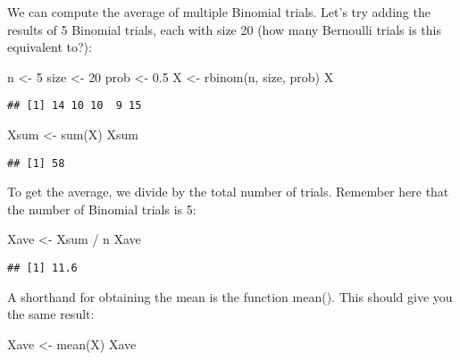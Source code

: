 \documentclass[
]{book}
\newenvironment{Shaded}{\begin{snugshade}}{\end{snugshade}}
\newcommand{\DecValTok}[1]{\textcolor[rgb]{0.00,0.00,0.81}{#1}}
\newcommand{\FloatTok}[1]{\textcolor[rgb]{0.00,0.00,0.81}{#1}}
\newcommand{\FunctionTok}[1]{\textcolor[rgb]{0.00,0.00,0.00}{#1}}
\newcommand{\NormalTok}[1]{#1}
\newcommand{\OtherTok}[1]{\textcolor[rgb]{0.56,0.35,0.01}{#1}}
\newcommand{\SpecialCharTok}[1]{\textcolor[rgb]{0.00,0.00,0.00}{#1}}
\begin{document}
We can compute the average of multiple Binomial trials. Let's try adding the results of 5 Binomial trials, each with size 20 (how many Bernoulli trials is this equivalent to?):

\begin{Shaded}
\begin{Highlighting}[]
\NormalTok{n }\OtherTok{\textless{}{-}} \DecValTok{5}
\NormalTok{size }\OtherTok{\textless{}{-}} \DecValTok{20}
\NormalTok{prob }\OtherTok{\textless{}{-}} \FloatTok{0.5}
\NormalTok{X }\OtherTok{\textless{}{-}} \FunctionTok{rbinom}\NormalTok{(n, size, prob)}
\NormalTok{X}
\end{Highlighting}
\end{Shaded}

\begin{verbatim}
## [1] 14 10 10  9 15
\end{verbatim}

\begin{Shaded}
\begin{Highlighting}[]
\NormalTok{Xsum }\OtherTok{\textless{}{-}} \FunctionTok{sum}\NormalTok{(X)}
\NormalTok{Xsum}
\end{Highlighting}
\end{Shaded}

\begin{verbatim}
## [1] 58
\end{verbatim}

To get the average, we divide by the total number of trials. Remember here that the number of Binomial trials is 5:

\begin{Shaded}
\begin{Highlighting}[]
\NormalTok{Xave }\OtherTok{\textless{}{-}}\NormalTok{ Xsum }\SpecialCharTok{/}\NormalTok{ n}
\NormalTok{Xave}
\end{Highlighting}
\end{Shaded}

\begin{verbatim}
## [1] 11.6
\end{verbatim}

A shorthand for obtaining the mean is the function mean(). This should give you the same result:

\begin{Shaded}
\begin{Highlighting}[]
\NormalTok{Xave }\OtherTok{\textless{}{-}} \FunctionTok{mean}\NormalTok{(X)}
\NormalTok{Xave}
\end{Highlighting}
\end{Shaded}
\end{document}
